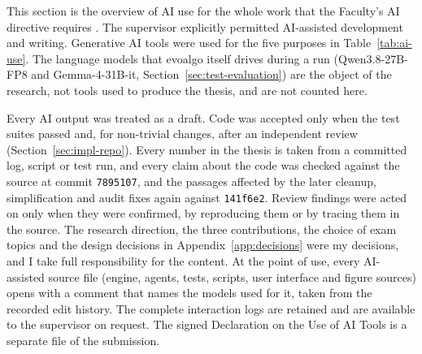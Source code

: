 This section is the overview of AI use for the whole work that the Faculty's
AI directive requires \citep{elteik2026aidirective}. The supervisor explicitly
permitted AI-assisted development and writing. Generative AI tools were used
for the five purposes in Table~\ref{tab:ai-use}. The language models that
evoalgo itself drives during a run (Qwen3.8-27B-FP8 and Gemma-4-31B-it,
Section~\ref{sec:test-evaluation}) are the object of the research, not tools
used to produce the thesis, and are not counted here.

Every AI output was treated as a draft. Code was accepted only when the test
suites passed and, for non-trivial changes, after an independent review
(Section~\ref{sec:impl-repo}). Every number in the thesis is taken from a
committed log, script or test run, and every claim about the code was checked
against the source at commit \texttt{7895107}, and the passages affected by the
later cleanup, simplification and audit fixes again against \texttt{141f6e2}. Review findings were acted on
only when they were confirmed, by reproducing them or by tracing them in the
source. The research direction, the three contributions, the choice of exam
topics and the design decisions in Appendix~\ref{app:decisions} were my
decisions, and I take full responsibility for the content. At the point of
use, every AI-assisted source file (engine, agents, tests, scripts, user
interface and figure sources) opens with a comment that names the models used
for it, taken from the recorded edit history. The complete
interaction logs are retained and are available to the supervisor on request.
The signed Declaration on the Use of AI Tools is a separate file of the
submission.

